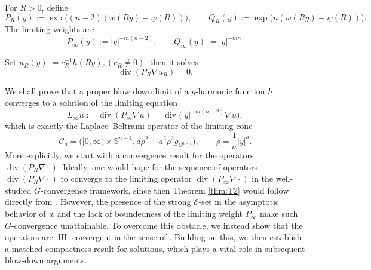\documentclass[10pt,a4paper]{amsart}
\numberwithin{equation}{section}
\begin{document}
For $R>0$, define
\begin{equation}\label{eq:def-AR-BR}
    P_R(y):=\exp\bigl((n-2)(w(Ry)-\underline w(R))\bigr),
    \qquad
    Q_R(y):=\exp\bigl(n(w(Ry)-\underline w(R))\bigr).
\end{equation}
The limiting weights are
\[
    P_\infty(y):=|y|^{-m(n-2)},
    \qquad
    Q_\infty(y):=|y|^{-mn}.
\]


Set $u_R(y):=c_R^{-1}h(Ry), (c_R\neq 0)$, then it solves
\[
    \operatorname{div}(P_R\nabla u_R)=0.
\]

We shall prove that a proper blow down limit of a $g$-harmonic function $h$ converges to a solution of the limiting equation
\begin{equation}\label{eq:limiting-operator}
    L_\infty u
    :=\operatorname{div}(P_\infty\nabla u)
    =\operatorname{div}\bigl(|y|^{-m(n-2)}\nabla u\bigr),
\end{equation}
 which is exactly the
Laplace--Beltrami operator of the limiting cone
\begin{equation}\label{eq. def of limiting cone}
    \mathcal{C}_a=
    \bigl([0,\infty)\times\mathbb S^{n-1},
    d\rho^2+a^2\rho^2g_{\mathbb S^{n-1}}\bigr),
    \qquad \rho=\frac{1}{a}|y|^a.
\end{equation}
{More explicitly, we start with a convergence result for the operators $\operatorname{div}(P_R\nabla\cdot)$.
Ideally, one would hope for the sequence of operators  $\operatorname{div}(P_{R}\nabla\cdot)$ to converge to the limiting operator $\operatorname{div}(P_{\infty}\nabla\cdot)$ in the well-studied $G$-convergence framework, since then Theorem \ref{thm:T2} would follow directly from \cite[Theorem 2.13]{L}.
 However,  the presence of the strong $\mathcal{E}$-set in the asymptotic behavior of $w$ and the lack of boundedness of the limiting weight $P_{\infty}$ make such $G$-convergence unattainable.
 To overcome this obstacle, we instead show that the operators are $\operatorname{III}$-convergent 
in the sense of \cite[Page 76]{ZKON}. 
Building on this, we then establish a matched compactness result for solutions, which plays a vital role in subsequent blow-down arguments.}
\end{document}
